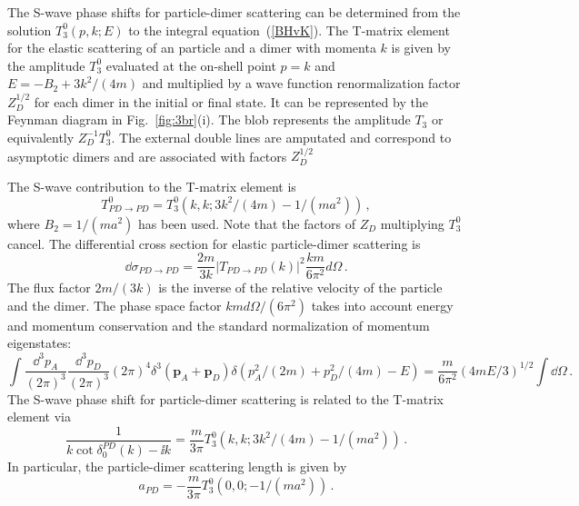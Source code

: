 The S-wave phase shifts for particle-dimer scattering can be determined
from the solution $T_3^0 (p, k; E)$ to the 
integral equation~(\ref{BHvK}).
The T-matrix element for the elastic scattering of an particle and a dimer 
with momenta $k$ is given by the amplitude $T_3^0$ 
evaluated at the on-shell point $p=k$ and $E= {-}B_2 + 3k^2/(4m)$
and multiplied by a wave function renormalization factor $Z_D^{1/2}$ 
for each dimer in the initial or final state.
It can be represented by the Feynman diagram in 
Fig.~\ref{fig:3br}(i).  The blob represents the amplitude $T_3$ or
equivalently $Z_D^{-1} T_3^0$.
The external double lines are amputated and correspond 
to asymptotic dimers and are associated with factors $Z_D^{1/2}$

The S-wave contribution to the T-matrix element is
\begin{equation}
 T_{PD \to PD}^{0} = 
 T_3^0 (k, k; 3k^2/(4m)-1/(ma^2)) \,,
\end{equation}
where $B_2=1/(ma^2)$ has been used.
Note that the factors of $Z_D$ multiplying $T_3^0$ cancel.
The differential cross section for elastic particle-dimer scattering is
\begin{equation}
 \dd \sigma_{PD \to PD}
 = \frac{2 m}{3 k} \left| T_{PD \to PD}(k) \right|^2
 \frac{k m}{6 \pi^2} d \Omega \,.
\label{T-AD}
\end{equation}
The flux factor $2m/(3 k)$ is the inverse of the relative velocity 
of the particle and the dimer.  The phase space factor 
$k md \Omega/(6 \pi^2)$ takes into account energy and momentum 
conservation and the standard normalization of momentum eigenstates:
\begin{equation}
 \int \frac{\dd^3 p_A}{(2 \pi)^3} \frac{\dd^3 p_D}{(2 \pi)^3} 
 (2 \pi)^4 \delta^3({\bm p}_A + {\bm p}_D)
 \delta(p_A^2/(2m) + p_D^2/(4m) - E)
 = \frac{m}{6 \pi^2} (4 mE/3)^{1/2} \int \dd\Omega \,.
\end{equation}
The S-wave phase shift for particle-dimer scattering
is related to the T-matrix element via
\begin{equation}
 \frac1{k\cot\delta^{PD}_0 (k) -\ii k}
 = \frac{m}{3 \pi} T_3^0 (k, k; 3k^2/(4m)-1/(ma^2)) \,.
\label{T12}
\end{equation}
In particular, the particle-dimer scattering length is given by
\begin{equation}
 a_{PD} = {-}\frac{m}{3 \pi} T_3^0 (0, 0; {-}1/(ma^2)) \,.
\end{equation}


